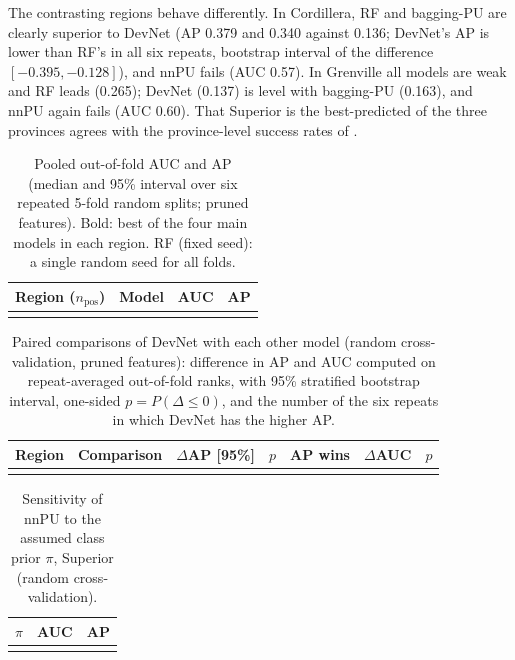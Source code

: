 \documentclass[pdflatex,sn-apa]{sn-jnl}
\begin{document}
The contrasting regions behave differently. In Cordillera, RF and bagging-PU are clearly superior to DevNet (AP 0.379 and 0.340 against 0.136; DevNet's AP is lower than RF's in all six repeats, bootstrap interval of the difference $[-0.395, -0.128]$), and nnPU fails (AUC 0.57). In Grenville all models are weak and RF leads (0.265); DevNet (0.137) is level with bagging-PU (0.163), and nnPU again fails (AUC 0.60). That Superior is the best-predicted of the three provinces agrees with the province-level success rates of \citet{Parsa2024}.

\begin{table}[t]
\caption{Pooled out-of-fold AUC and AP (median and 95\% interval over six repeated 5-fold random splits; pruned features). Bold: best of the four main models in each region. RF (fixed seed): a single random seed for all folds.}\label{tab:benchmark}
\footnotesize
\begin{tabular*}{\textwidth}{@{\extracolsep\fill}llcc}
\toprule
Region ($n_{\mathrm{pos}}$) & Model & AUC & AP \\
\midrule
\botrule
\end{tabular*}
\end{table}

\begin{table}[t]
\caption{Paired comparisons of DevNet with each other model (random cross-validation, pruned features): difference in AP and AUC computed on repeat-averaged out-of-fold ranks, with 95\% stratified bootstrap interval, one-sided $p = P(\Delta \leq 0)$, and the number of the six repeats in which DevNet has the higher AP.}\label{tab:bootstrap}
\footnotesize
\setlength{\tabcolsep}{2.5pt}
\begin{tabular*}{\textwidth}{@{\extracolsep\fill}llccccc}
\toprule
Region & Comparison & $\Delta$AP [95\%] & $p$ & AP wins & $\Delta$AUC & $p$ \\
\midrule
\botrule
\end{tabular*}
\end{table}

\begin{table}[t]
\caption{Sensitivity of nnPU to the assumed class prior $\pi$, Superior (random cross-validation).}\label{tab:prior}
\footnotesize
\begin{tabular*}{0.6\textwidth}{@{\extracolsep\fill}lcc}
\toprule
$\pi$ & AUC & AP \\
\midrule
\botrule
\end{tabular*}
\end{table}
\end{document}
